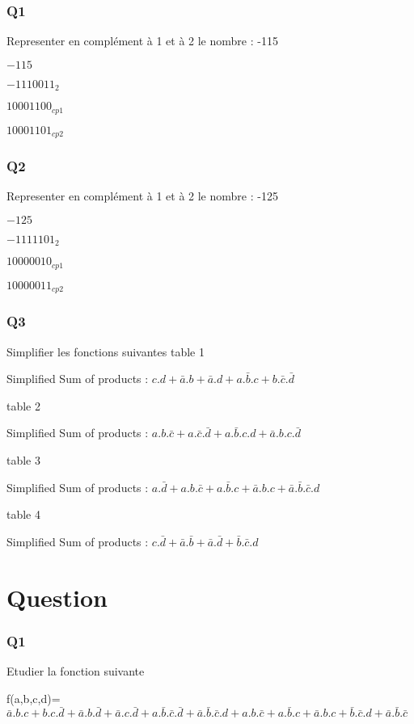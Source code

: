 \subsubsection{Q1}

Representer en complément à 1 et à 2 le nombre  : -115

$-115$

$ -1110011_{2}$

$ 10001100_{cp1}$

$ 10001101_{cp2}$
\subsubsection{Q2}

Representer en complément à 1 et à 2 le nombre  : -125

$-125$

$ -1111101_{2}$

$ 10000010_{cp1}$

$ 10000011_{cp2}$
\subsubsection{Q3}

Simplifier les fonctions suivantes
table 1

Simplified Sum of products : $c.d+\bar a.b+\bar a.d+a.\bar b.c+b.\bar c.\bar d$

table 2

Simplified Sum of products : $a.b.\bar c+a.\bar c.\bar d+a.\bar b.c.d+\bar a.b.c.\bar d$

table 3

Simplified Sum of products : $a.\bar d+a.b.\bar c+a.\bar b.c+\bar a.b.c+\bar a.\bar b.\bar c.d$

table 4

Simplified Sum of products : $c.\bar d+\bar a.\bar b+\bar a.\bar d+\bar b.\bar c.d$

\pagebreak
\section{Question}

\subsubsection{Q1}

Etudier la fonction suivante

f(a,b,c,d)= $\bar a.b.c+b.c.\bar d+\bar a.b.\bar d+\bar a.c.\bar d+a.\bar b.\bar c.\bar d+\bar a.\bar b.\bar c.d + a.b.\bar c+a.\bar b.c+\bar a.b.c+\bar b.\bar c.d+\bar a.\bar b.\bar c$

